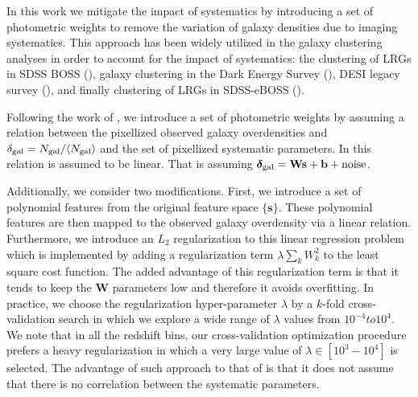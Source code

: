 \documentclass[fleqn,usenatbib,useAMS]{mnras}
\begin{document}

In this work we mitigate the impact of systematics by introducing a set of photometric weights to remove the variation of galaxy densities due to imaging systematics. This approach has been widely utilized in the galaxy clustering analyses in order to account for the impact of systematics: the clustering of LRGs in SDSS BOSS (\citealt{ross2012clustering, ross2017clustering}), galaxy clustering in the Dark Energy Survey (\citealt{elvin2017,crocce2019dark}), DESI legacy survey (\citealt{DESI_systematic}), and finally clustering of LRGs in SDSS-eBOSS (\citealt{bautista2018sdss, icaza2020clustering}). 

Following the work of \citet{bautista2018sdss}, we introduce a set of photometric weights by assuming a relation between the pixellized observed galaxy overdensities and $\delta_{\rm gal} = N_{\rm gal}/\langle N_{\rm gal}\rangle$ and the set of pixellized systematic parameters. In \citet{bautista2018sdss} this relation is assumed to be linear. That is assuming $\boldsymbol{\delta}_{\rm gal} = \mathbf{Ws+b} + \mathbf{\mathrm{noise}}$. 

Additionally, we consider two modifications. First, we introduce a set of polynomial features from the original feature space $\{\mathbf{s}\}$. These polynomial features are then mapped to the observed galaxy overdensity via a linear relation. Furthermore, we introduce an $L_{2}$ regularization to this linear regression problem which is implemented by adding a regularization term $\lambda \sum_{k} W_k^2$ to the least square cost function. The added advantage of this regularization term is that it tends to keep the $\mathbf{W}$ parameters low and therefore it avoids overfitting.  
In practice, we choose the regularization hyper-parameter $\lambda$ by a $k$-fold cross-validation search in which we explore a wide range of $\lambda$ values from $10^{-4} to 10^{4}$. We note that in all the redshift bins, our cross-validation optimization procedure prefers a heavy regularization in which a very large value of $\lambda \in [10^3-10^4]$ is selected. The advantage of such approach to that of \citet{ross2017clustering} is that it does not assume that there is no correlation between the systematic parameters. 
\end{document}
